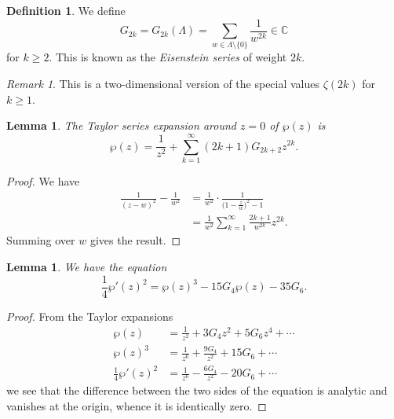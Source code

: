 \documentclass[a4paper]{article}
\theoremstyle{plain}
\newtheorem{lemma}[theorem]{Lemma}
\theoremstyle{remark}
\newtheorem*{remark}{Remark}
\theoremstyle{definition}
\newtheorem*{definition}{Definition}
\newcommand{\C}{\mathbb{C}}
\begin{document}
\begin{definition}
    We define
    \begin{equation*}
        G_{2k} = G_{2k}(\Lambda)
            = \sum_{w\in\Lambda\setminus\{0\}}\frac{1}{w^{2k}} \in \C
    \end{equation*}
    for $k\ge2$. This is known as the \emph{Eisenstein series} of weight $2k$.
\end{definition}

\begin{remark}
    This is a two-dimensional version of the special values $\zeta(2k)$ for
    $k\ge1$.
\end{remark}

\begin{lemma}
    The Taylor series expansion around $z=0$ of $\wp(z)$ is
    \begin{equation*}
        \wp(z) = \frac{1}{z^2} + \sum_{k=1}^\infty(2k+1)G_{2k+2}z^{2k}.
    \end{equation*}
\end{lemma}

\begin{proof}
    We have
    \begin{align*}
        \frac{1}{(z-w)^2} - \frac{1}{w^2}
            &= \frac{1}{w^2}\cdot\frac{1}{\bigl(1-\frac{z}{w}\bigr)^2-1} \\
            &= \frac{1}{w^2}\sum_{k=1}^\infty\frac{2k+1}{w^{2k}}z^{2k}.
    \end{align*}
    Summing over $w$ gives the result.
\end{proof}

\begin{lemma}
    We have the equation
    \begin{equation*}
        \frac{1}{4}\wp'(z)^2 = \wp(z)^3 - 15G_4\wp(z) - 35G_6.
    \end{equation*}
\end{lemma}

\begin{proof}
    From the Taylor expansions
    \begin{align*}
        \wp(z) &= \frac{1}{z^2} + 3G_4z^2 + 5G_6z^4 + \cdots \\
        \wp(z)^3 &= \frac{1}{z^6} + \frac{9G_4}{z^2} + 15G_6 + \cdots \\
        \frac{1}{4}\wp'(z)^2 &= \frac{1}{z^6} - \frac{6G_4}{z^2} - 20G_6 + \cdots
    \end{align*}
    we see that the difference between the two sides of the equation is analytic
    and vanishes at the origin, whence it is identically zero.
\end{proof}
\end{document}
